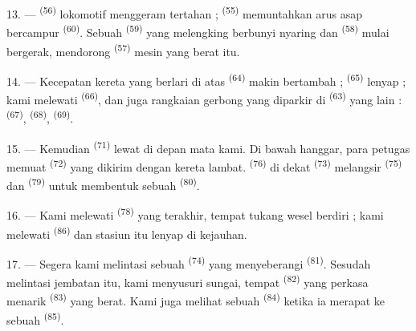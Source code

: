 13. ---  \textsuperscript{(56)} lokomotif menggeram
tertahan ;  \textsuperscript{(55)} memuntahkan arus
asap bercampur  \textsuperscript{(60)}. Sebuah
 \textsuperscript{(59)} yang melengking berbunyi nyaring
dan  \textsuperscript{(58)} mulai bergerak, mendorong
 \textsuperscript{(57)} mesin yang berat itu.

\VUsaut{3.0mm}
\VUsaut{3.0mm}

14. --- Kecepatan kereta yang berlari di atas 
\textsuperscript{(64)} makin bertambah ; 
\textsuperscript{(65)} lenyap ; kami melewati 
\textsuperscript{(66)}, dan juga rangkaian gerbong yang diparkir di
 \textsuperscript{(63)} yang lain :  \textsuperscript{(67)}, 
\textsuperscript{(68)},  \textsuperscript{(69)}.


15. --- Kemudian  \textsuperscript{(71)} lewat
di depan mata kami. Di bawah hanggar, para petugas memuat
 \textsuperscript{(72)} yang dikirim dengan kereta
lambat.  \textsuperscript{(76)} di dekat
 \textsuperscript{(73)} melangsir  \textsuperscript{(75)} dan  \textsuperscript{(79)} untuk membentuk sebuah  \textsuperscript{(80)}.

16. --- Kami melewati  \textsuperscript{(78)} yang
terakhir, tempat tukang wesel berdiri ; kami melewati 
\textsuperscript{(86)} dan stasiun itu lenyap di kejauhan.

17. --- Segera kami melintasi sebuah 
\textsuperscript{(74)} yang menyeberangi 
\textsuperscript{(81)}. Sesudah melintasi jembatan itu, kami menyusuri
sungai, tempat  \textsuperscript{(82)} yang
perkasa menarik  \textsuperscript{(83)} yang
berat. Kami juga melihat sebuah 
\textsuperscript{(84)} ketika ia merapat ke sebuah 
\textsuperscript{(85)}.

